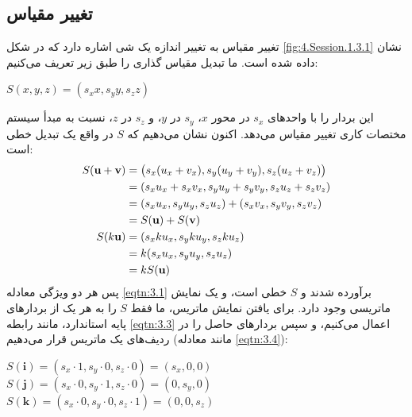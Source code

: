 \subsection{\textbf{تغییر مقیاس}}
\label{subsec:3.1.3}
{
    \Large
    \begin{spacing}{1.5}
        تغییر مقیاس به تغییر اندازه یک شی اشاره دارد که در شکل \ref{fig:4.Session.1.3.1} نشان داده شده است.
        ما تبدیل مقیاس گذاری را طبق زیر تعریف می‌کنیم:

        \begin{center}
            $S(x,y,z)=(s_{x}x,s_{y}y,s_{z}z)$
        \end{center}

        این بردار را با واحدهای $s_x$ در محور $x$، $s_y$ در $y$، و $s_z$ در $z$،
        نسبت به مبدأ سیستم مختصات کاری تغییر مقیاس می‌دهد.
        اکنون نشان می‌دهیم که $S$ در واقع یک تبدیل خطی است:
        \textbf{\vspace{-20pt}}
        \begin{equation*}
            \centering
            \begin{split}
                S(\textbf{u}+\textbf{v})&=\left( s_{x}(u_{x}+v_{x}), s_{y}(u_{y}+v_{y}), s_{z}(u_{z}+v_{z}) \right) \\
                &=(s_{x}u_{x}+s_{x}v_{x}, s_{y}u_{y}+s_{y}v_{y}, s_{z}u_{z}+s_{z}v_{z}) \\
                &=(s_{x}u_{x}, s_{y}u_{y}, s_{z}u_{z})+(s_{x}v_{x}, s_{y}v_{y}, s_{z}v_{z}) \\
                &=S(\textbf{u})+S(\textbf{v}) \\
                S(k\textbf{u})&=(s_{x}ku_{x}, s_{y}ku_{y}, s_{z}ku_{z}) \\
                &=k(s_{x}u_{x}, s_{y}u_{y}, s_{z}u_{z}) \\
                &=kS(\textbf{u}) \\
            \end{split}
        \end{equation*}
        پس هر دو ویژگی معادله \ref{eqtn:3.1} برآورده شدند و $S$ خطی است،
        و یک نمایش ماتریسی وجود دارد. برای یافتن نمایش ماتریس، ما فقط $S$ را به هر یک از بردارهای پایه استاندارد، مانند رابطه \ref{eqtn:3.3} اعمال می‌کنیم،
        و سپس بردارهای حاصل را در ردیف‌های یک ماتریس قرار می‌دهیم (مانند معادله \ref{eqtn:3.4}):

        \begin{center}
            $S(\textbf{i})=(s_x\cdot 1,s_y\cdot 0,s_z\cdot 0)=(s_x,0,0)$ \\
            $S(\textbf{j})=(s_x\cdot 0,s_y\cdot 1,s_z\cdot 0)=(0,s_y,0)$ \\
            $S(\textbf{k})=(s_x\cdot 0,s_y\cdot 0,s_z\cdot 1)=(0,0,s_z)$
        \end{center}


\end{spacing}}
